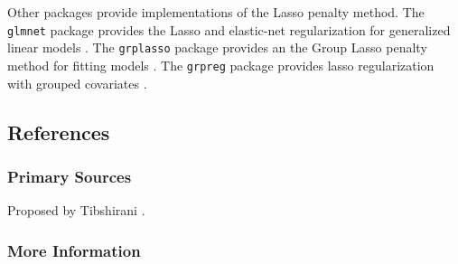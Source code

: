 


Other packages provide implementations of the Lasso penalty method.
The \texttt{glmnet} package provides the Lasso and elastic-net regularization for generalized linear models \cite{Friedman2011}.
The \texttt{grplasso} package provides an the Group Lasso penalty method for fitting models \cite{Meier2009}.
The \texttt{grpreg} package provides lasso regularization with grouped covariates \cite{Brehen2011}.



\subsection{References}

\subsubsection{Primary Sources}

Proposed by Tibshirani \cite{Tibshirani1996}.

\subsubsection{More Information}



